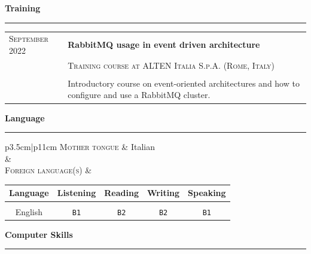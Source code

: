 \documentclass[english,10pt,a4paper]{article}
\newcommand{\CvSection}[2]{\vspace{0.5cm}
	{\LARGE \textcolor{CvColor}{#1 \hspace{2pt} \textbf{#2}}} \\
	\textcolor{CvColor}{\rule[.5\baselineskip]{0.5\textwidth}{0.5pt}}}
\newcommand{\CvDate}[1]{\textcolor{CvColor}{{\textsc{#1}}}}
\def\SidebarHSize{3.5cm}
\def\BodyHSize{11cm}
\begin{document}
	\CvSection{\faBook}{Training}
	
	\begin{longtable}{p{\SidebarHSize}|p{\BodyHSize}}
		\CvDate{September 2022} & \textbf{RabbitMQ usage in event driven architecture} \\
		& \textsc{Training course at ALTEN Italia S.p.A. (Rome, Italy)} \\
		& \\	
		& Introductory course on event-oriented architectures and how to configure and use a RabbitMQ cluster.
	\end{longtable}
	
	\CvSection{\faLanguage}{Language}

	\begin{longtable}{p{\SidebarHSize}|p{\BodyHSize}}
		\CvDate{Mother tongue} & Italian \\
		& \\
		
		\CvDate{Foreign language(s)} & \begin{tabular}{c|c|c|c|c}
			\textbf{Language} & \textbf{Listening} & \textbf{Reading} & \textbf{Writing} & \textbf{Speaking} \\
			\hline 
			&&&&\\		
			English & \texttt{B1} & \texttt{B2} & \texttt{B2} & \texttt{B1} \\
		\end{tabular}
	\end{longtable} 
	
	\CvSection{\faLaptop}{Computer Skills}

	
\end{document}
